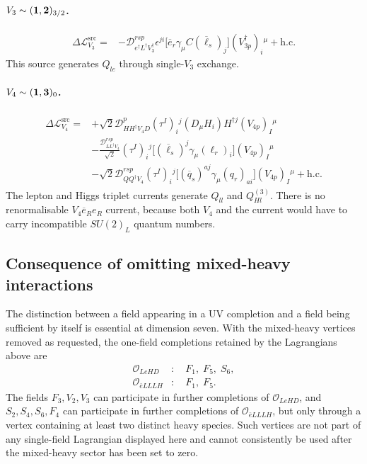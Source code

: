 \paragraph{$V_3\sim({\bf1},{\bf2})_{3/2}$.}
\begin{align}
    \Delta\mathcal L_{V_3}^{\mathrm{src}}
    ={}&-\mathcal D_{e^\dagger L^\dagger V_3^\dagger}^{rsp}
       \epsilon^{ji}\big[\overline e_r\gamma_\mu
       C(\overline\ell_s)_j\big](V_{3p}^\dagger)_i{}^\mu
       +\mathrm{h.c.}
    \label{eq:uv-lag-V3}
\end{align}
This source generates $Q_{le}$ through single-$V_3$ exchange.

\paragraph{$V_4\sim({\bf1},{\bf3})_0$.}
\begin{align}
\begin{split}
    \Delta\mathcal L_{V_4}^{\mathrm{src}}={}&
       +\sqrt2\mathcal D_{HH^\dagger V_4D}^{p}
        (\tau^I)_i{}^j(D_\mu H_i)H^{\dagger j}(V_{4p})_I{}^\mu
        \\
      &-\frac{\mathcal D_{LL^\dagger V_4}^{rsp}}{\sqrt2}
        (\tau^I)_i{}^j
        \big[(\overline\ell_s)^j\gamma_\mu(\ell_r)_i\big](V_{4p})_I{}^\mu
        \\
      &-\sqrt2\mathcal D_{QQ^\dagger V_4}^{rsp}
        (\tau^I)_i{}^j
        \big[(\overline q_s)^{aj}\gamma_\mu(q_r)_{ai}\big](V_{4p})_I{}^\mu
       +\mathrm{h.c.}
\end{split}
\label{eq:uv-lag-V4}
\end{align}
The lepton and Higgs triplet currents generate $Q_{ll}$ and
$Q_{Hl}^{(3)}$.  There is no renormalisable $V_4\overline e_R e_R$ current,
because both $V_4$ and the current would have to carry incompatible
$SU(2)_L$ quantum numbers.

\subsection{Consequence of omitting mixed-heavy interactions}

The distinction between a field appearing in a UV completion and a field
being sufficient by itself is essential at dimension seven.  With the
mixed-heavy vertices removed as requested, the one-field completions retained
by the Lagrangians above are
\begin{align}
    \mathcal O_{LeHD}&:\quad F_1,\;F_5,\;S_6,
    \\
    \mathcal O_{\bar eLLLH}&:\quad F_1,\;F_5.
\end{align}
The fields $F_3,V_2,V_3$ can participate in further completions of
$\mathcal O_{LeHD}$, and $S_2,S_4,S_6,F_4$ can participate in further
completions of $\mathcal O_{\bar eLLLH}$, but only through a vertex containing
at least two distinct heavy species.  Such vertices are not part of any
single-field Lagrangian displayed here and cannot consistently be used after
the mixed-heavy sector has been set to zero.